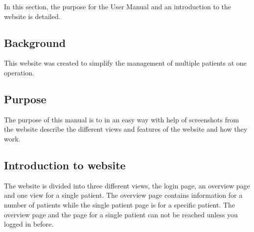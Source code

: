 In this section, the purpose for the User Manual and an introduction to the website is detailed.

\subsection{Background}

This website was created to simplify the management of multiple patients at one operation.  

\subsection{Purpose}

The purpose of this manual is to in an easy way with help of screenshots from the website describe the different views and features of the website and how they work. 

\subsection{Introduction to website}

The website is divided into three different views, the login page, an overview page and one view for a single patient. The overview page contains information for a number of patients while the single patient page is for a specific patient. The overview page and the page for a single patient can not be reached unless you logged in before.